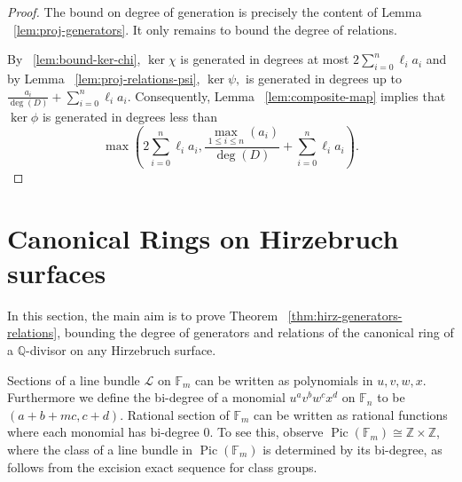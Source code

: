 \documentclass{amsart}
\theoremstyle{plain}
\theoremstyle{definition}
\theoremstyle{remark}
\numberwithin{equation}{section}
\newcommand\bq{{\mathbb Q}}
\newcommand\bz{{\mathbb Z}}
\newcommand\bida{a}
\newcommand\hirz{\mathbb{F}}
\DeclareMathOperator{\Pic}{Pic}
\begin{document}
\restateproj*

\begin{proof}
The bound on degree of generation is precisely the content of Lemma 
~\ref{lem:proj-generators}. It only remains to bound the degree of 
relations.

By ~\ref{lem:bound-ker-chi}, $\ker \chi$ is generated in degrees 
at most $2\sum_{i=0}^n \ell_i a_i$ and by Lemma
~\ref{lem:proj-relations-psi}, $\ker \psi,$ is generated in
degrees up to $\frac{\bida_i}{\deg(D)} + \sum_{i=0}^n \ell_i a_i$. 
Consequently, Lemma ~\ref{lem:composite-map} implies that $\ker \phi$
is generated in degrees less than
\[
	\max \left(2 \sum_{i=0}^n \ell_i a_i, \frac{\max_{1\le i \le n}
	(\bida_i)}{\deg(D)} + \sum_{i=0}^n \ell_i a_i \right).
\]
\end{proof}

\section{Canonical Rings on Hirzebruch surfaces}
\label{sec:hirz}
In this section, the main aim is to prove Theorem
~\ref{thm:hirz-generators-relations}, bounding the degree of
generators and relations of the canonical ring of a $\bq$-divisor
on any Hirzebruch surface.

Sections of a line bundle $\mathscr L$ on $\hirz_m$ can be written as
polynomials in $u,v, w,x$.
Furthermore we define the bi-degree of a monomial $u^a v^{b} w^c x^d$
on $\hirz_n$ to be
$(a + b + mc, c + d)$.  Rational section of $\hirz_m$ can be written as
rational functions where each monomial has bi-degree 0. To see this, 
observe
$\Pic(\hirz_m) \cong \bz \times \bz$, where the class of a line bundle
in $\Pic(\hirz_m)$
is determined by its bi-degree, as follows from the excision exact sequence
for class groups.
\end{document}
